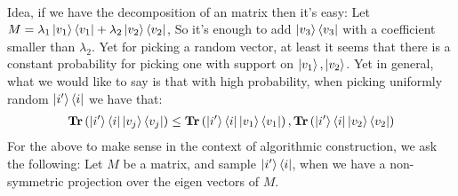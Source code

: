 \documentclass[manuscript,screen,review]{acmart}
\begin{document}
\paragraph{}



Idea, if we have the decomposition of an matrix then it's easy: Let $ M= \lambda_{1}\ket{v_{1}}\bra{v_{1}} +\lambda_{2}\ket{v_{2}}\bra{v_{2}}  $, So it's enough to add $\ket{v_3}\bra{v_3}$ with a coefficient smaller than $\lambda_2$. Yet for picking a random vector, at least it seems that there is a constant probability for picking one with support on $\ket{v_{1}}, \ket{v_2}$.
Yet in general, what we would like to say is that with high probability, when picking uniformly random $\ket{i^\prime}\bra{i}$ we have that: 
\begin{equation*}
    \begin{split}
    \textbf{Tr}\left(  \ket{i^\prime}\bra{i} \ket{v_j}\bra{v_j} \right) \le \textbf{Tr}\left(  \ket{i^\prime}\bra{i} \ket{v_1}\bra{v_1} \right), \textbf{Tr}\left(  \ket{i^\prime}\bra{i} \ket{v_2}\bra{v_2} \right)
    \end{split}
\end{equation*}
For the above to make sense in the context of algorithmic construction, we ask the following: Let $M$ be a matrix, and sample $\ket{i^\prime}\bra{i}$, when we have a non-symmetric projection over the eigen vectors of $M$. 

\end{document}
